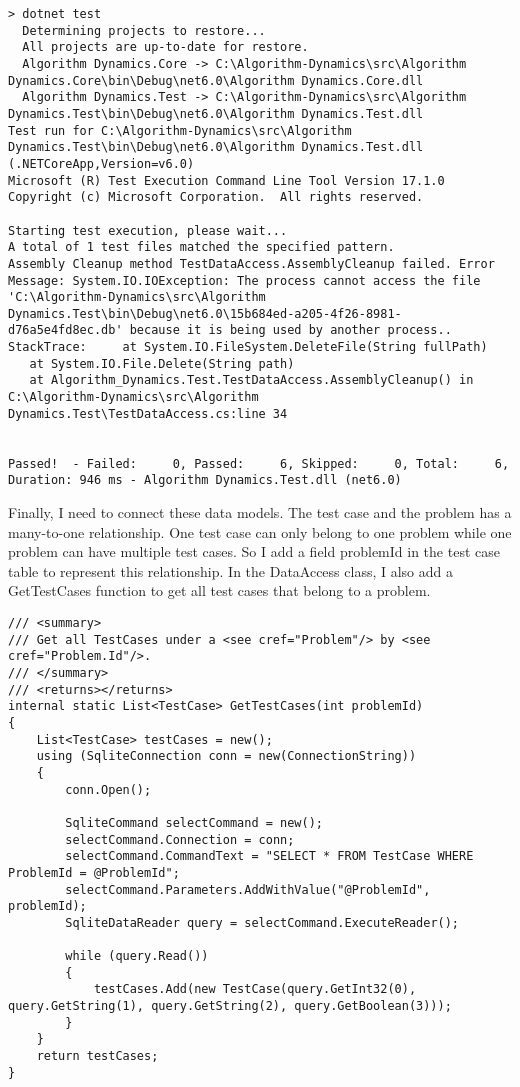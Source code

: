 \documentclass[report.tex]{subfiles}
\begin{document}
\begin{verbatim}
> dotnet test
  Determining projects to restore...
  All projects are up-to-date for restore.
  Algorithm Dynamics.Core -> C:\Algorithm-Dynamics\src\Algorithm Dynamics.Core\bin\Debug\net6.0\Algorithm Dynamics.Core.dll
  Algorithm Dynamics.Test -> C:\Algorithm-Dynamics\src\Algorithm Dynamics.Test\bin\Debug\net6.0\Algorithm Dynamics.Test.dll
Test run for C:\Algorithm-Dynamics\src\Algorithm Dynamics.Test\bin\Debug\net6.0\Algorithm Dynamics.Test.dll (.NETCoreApp,Version=v6.0)
Microsoft (R) Test Execution Command Line Tool Version 17.1.0
Copyright (c) Microsoft Corporation.  All rights reserved.

Starting test execution, please wait...
A total of 1 test files matched the specified pattern.
Assembly Cleanup method TestDataAccess.AssemblyCleanup failed. Error Message: System.IO.IOException: The process cannot access the file 'C:\Algorithm-Dynamics\src\Algorithm Dynamics.Test\bin\Debug\net6.0\15b684ed-a205-4f26-8981-d76a5e4fd8ec.db' because it is being used by another process.. StackTrace:     at System.IO.FileSystem.DeleteFile(String fullPath)
   at System.IO.File.Delete(String path)
   at Algorithm_Dynamics.Test.TestDataAccess.AssemblyCleanup() in C:\Algorithm-Dynamics\src\Algorithm Dynamics.Test\TestDataAccess.cs:line 34


Passed!  - Failed:     0, Passed:     6, Skipped:     0, Total:     6, Duration: 946 ms - Algorithm Dynamics.Test.dll (net6.0)
\end{verbatim}

Finally, I need to connect these data models. The test case and the problem has a many-to-one relationship. One test case can only belong to one problem while one problem can have multiple test cases. So I add a field problemId in the test case table to represent this relationship. In the DataAccess class, I also add a GetTestCases function to get all test cases that belong to a problem.

\begin{verbatim}
/// <summary>
/// Get all TestCases under a <see cref="Problem"/> by <see cref="Problem.Id"/>.
/// </summary>
/// <returns></returns>
internal static List<TestCase> GetTestCases(int problemId)
{
    List<TestCase> testCases = new();
    using (SqliteConnection conn = new(ConnectionString))
    {
        conn.Open();

        SqliteCommand selectCommand = new();
        selectCommand.Connection = conn;
        selectCommand.CommandText = "SELECT * FROM TestCase WHERE ProblemId = @ProblemId";
        selectCommand.Parameters.AddWithValue("@ProblemId", problemId);
        SqliteDataReader query = selectCommand.ExecuteReader();

        while (query.Read())
        {
            testCases.Add(new TestCase(query.GetInt32(0), query.GetString(1), query.GetString(2), query.GetBoolean(3)));
        }
    }
    return testCases;
}
\end{verbatim}
\end{document}
